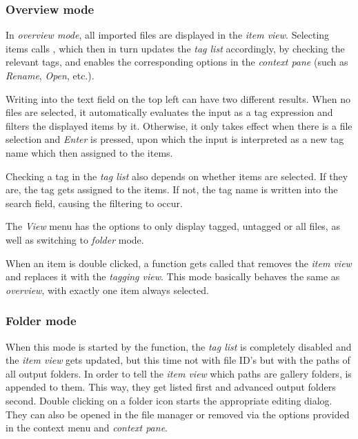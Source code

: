 \subsubsection{Overview mode}

In \emph{overview mode}, all imported files are displayed in the \emph{item view}. Selecting items calls , which then in turn updates the \emph{tag list} accordingly, by checking the relevant tags, and enables the corresponding options in the \emph{context pane} (such as \emph{Rename}, \emph{Open}, etc.). 

Writing into the text field on the top left can have two different results. When no files are selected, it automatically evaluates the input as a tag expression and filters the displayed items by it. Otherwise, it only takes effect when there is a file selection and \emph{Enter} is pressed, upon which the input is interpreted as  a new tag name which then assigned to the items. 

Checking a tag in the \emph{tag list} also depends on whether items are selected. If they are, the tag gets assigned to the items. If not, the tag name is written into the search field, causing the filtering to occur.

The \emph{View} menu has the options to only display tagged, untagged or all files, as well as switching to \emph{folder} mode.

When an item is double clicked, a function gets called that removes the \emph{item view} and replaces it with the \emph{tagging view}. This mode basically behaves the same as \emph{overview}, with exactly one item always selected.

\subsubsection{Folder mode}
When this mode is started by the  function, the \emph{tag list} is completely disabled and the \emph{item view} gets updated, but this time not with file ID's but with the paths of all output folders. In order to tell the \emph{item view} which paths are gallery folders,  is appended to them. This way, they get listed first and advanced output folders second. Double clicking on a folder icon starts the appropriate editing dialog. They can also be opened in the file manager or removed via the options provided in the context menu and \emph{context pane}.

